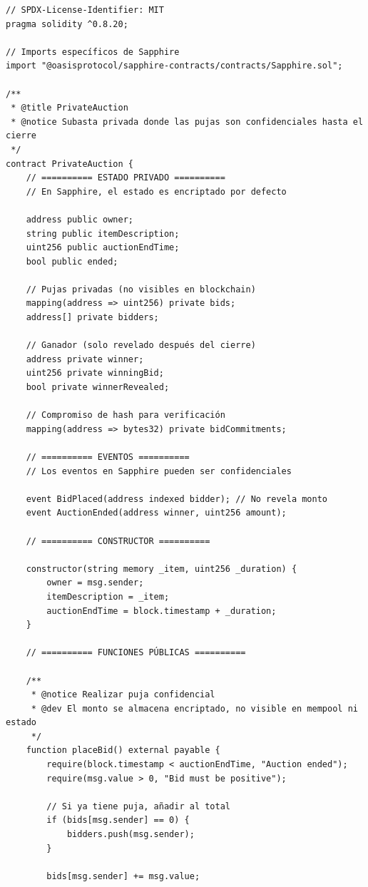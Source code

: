 \documentclass[11pt,a4paper,twoside]{book}
\theoremstyle{definition}
\theoremstyle{remark}
\begin{document}
\begin{lstlisting}[language=Solidity, caption={Contrato confidencial en Oasis Sapphire}]
// SPDX-License-Identifier: MIT
pragma solidity ^0.8.20;

// Imports específicos de Sapphire
import "@oasisprotocol/sapphire-contracts/contracts/Sapphire.sol";

/**
 * @title PrivateAuction
 * @notice Subasta privada donde las pujas son confidenciales hasta el cierre
 */
contract PrivateAuction {
    // ========== ESTADO PRIVADO ==========
    // En Sapphire, el estado es encriptado por defecto
    
    address public owner;
    string public itemDescription;
    uint256 public auctionEndTime;
    bool public ended;
    
    // Pujas privadas (no visibles en blockchain)
    mapping(address => uint256) private bids;
    address[] private bidders;
    
    // Ganador (solo revelado después del cierre)
    address private winner;
    uint256 private winningBid;
    bool private winnerRevealed;
    
    // Compromiso de hash para verificación
    mapping(address => bytes32) private bidCommitments;
    
    // ========== EVENTOS ==========
    // Los eventos en Sapphire pueden ser confidenciales
    
    event BidPlaced(address indexed bidder); // No revela monto
    event AuctionEnded(address winner, uint256 amount);
    
    // ========== CONSTRUCTOR ==========
    
    constructor(string memory _item, uint256 _duration) {
        owner = msg.sender;
        itemDescription = _item;
        auctionEndTime = block.timestamp + _duration;
    }
    
    // ========== FUNCIONES PÚBLICAS ==========
    
    /**
     * @notice Realizar puja confidencial
     * @dev El monto se almacena encriptado, no visible en mempool ni estado
     */
    function placeBid() external payable {
        require(block.timestamp < auctionEndTime, "Auction ended");
        require(msg.value > 0, "Bid must be positive");
        
        // Si ya tiene puja, añadir al total
        if (bids[msg.sender] == 0) {
            bidders.push(msg.sender);
        }
        
        bids[msg.sender] += msg.value;
        

\end{lstlisting}
\end{document}

